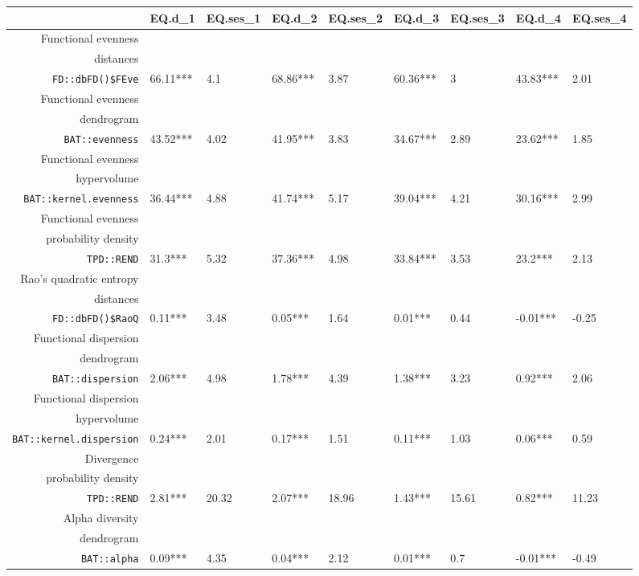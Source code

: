 \begin{table}[ht]
\scriptsize
\centering
\begin{tabular}{rllllllll}
  \hline
 & EQ.d\_1 & EQ.ses\_1 & EQ.d\_2 & EQ.ses\_2 & EQ.d\_3 & EQ.ses\_3 & EQ.d\_4 & EQ.ses\_4 \\ 
  \hline
Functional evenness\\distances\\\texttt{FD::dbFD()\$FEve} & 66.11*** & 4.1 & 68.86*** & 3.87 & 60.36*** & 3 & 43.83*** & 2.01 \\ 
  Functional evenness\\dendrogram\\\texttt{BAT::evenness} & 43.52*** & 4.02 & 41.95*** & 3.83 & 34.67*** & 2.89 & 23.62*** & 1.85 \\ 
  Functional evenness\\hypervolume\\\texttt{BAT::kernel.evenness} & 36.44*** & 4.88 & 41.74*** & 5.17 & 39.04*** & 4.21 & 30.16*** & 2.99 \\ 
  Functional evenness\\probability density\\\texttt{TPD::REND} & 31.3*** & 5.32 & 37.36*** & 4.98 & 33.84*** & 3.53 & 23.2*** & 2.13 \\ 
  Rao's quadratic entropy\\distances\\\texttt{FD::dbFD()\$RaoQ} & 0.11*** & 3.48 & 0.05*** & 1.64 & 0.01*** & 0.44 & -0.01*** & -0.25 \\ 
  Functional dispersion\\dendrogram\\\texttt{BAT::dispersion} & 2.06*** & 4.98 & 1.78*** & 4.39 & 1.38*** & 3.23 & 0.92*** & 2.06 \\ 
  Functional dispersion\\hypervolume\\\texttt{BAT::kernel.dispersion} & 0.24*** & 2.01 & 0.17*** & 1.51 & 0.11*** & 1.03 & 0.06*** & 0.59 \\ 
  Divergence\\probability density\\\texttt{TPD::REND} & 2.81*** & 20.32 & 2.07*** & 18.96 & 1.43*** & 15.61 & 0.82*** & 11.23 \\ 
  Alpha diversity\\dendrogram\\\texttt{BAT::alpha} & 0.09*** & 4.35 & 0.04*** & 2.12 & 0.01*** & 0.7 & -0.01*** & -0.49 \\ 

\end{tabular}
\end{table}
